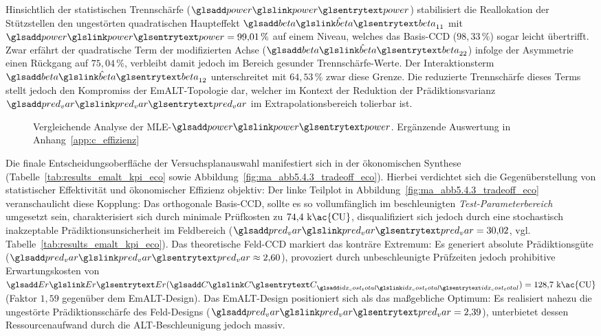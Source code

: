 Hinsichtlich der statistischen Trennschärfe ($\sym{power}$) stabilisiert die Reallokation der Stützstellen den ungestörten quadratischen Haupteffekt $\hat{\sym{beta}}_{11}$ mit $\sym{power} = 99{,}01\,\%$ auf einem Niveau, welches das Basis-\ac{CCD} ($98{,}33\,\%$) sogar leicht übertrifft.
Zwar erfährt der quadratische Term der modifizierten Achse ($\hat{\sym{beta}}_{22}$) infolge der Asymmetrie einen Rückgang auf $75{,}04\,\%$, verbleibt damit jedoch im Bereich gesunder Trennschärfe-Werte.
Der Interaktionsterm $\hat{\sym{beta}}_{12}$ unterschreitet mit $64{,}53\,\%$ zwar diese Grenze.
Die reduzierte Trennschärfe dieses Terms stellt jedoch den Kompromiss der \ac{EmALT}-Topologie dar, welcher im Kontext der Reduktion der Prädiktionsvarianz $\sym{pred_var}$ im Extrapolationsbereich tolierbar ist.
\begin{figure}[htbp]
    \centering
    \setlength{}
    \setlength\figureheight{5cm}
    
    \caption{Vergleichende Analyse der \ac{MLE}-$\sym{power}$. Ergänzende Auswertung in Anhang~\ref{app:c_effizienz}}
    \label{fig:ma_abb5.4.3_powerdev_wbl}
\end{figure}
Die finale Entscheidungsoberfläche der Versuchsplanauswahl manifestiert sich in der ökonomischen Synthese (Tabelle~\ref{tab:results_emalt_kpi_eco} sowie Abbildung~\ref{fig:ma_abb5.4.3_tradeoff_eco}).
Hierbei verdichtet sich die Gegenüberstellung von statistischer Effektivität und ökonomischer Effizienz objektiv:
Der linke Teilplot in Abbildung~\ref{fig:ma_abb5.4.3_tradeoff_eco} veranschaulicht diese Kopplung:
Das orthogonale Basis-\ac{CCD}, sollte es so vollumfänglich im beschleunigten \textit{Test-Parameterbereich} umgesetzt sein, charakterisiert sich durch minimale Prüfkosten zu $74{,}4\text{ k\ac{CU}}$, disqualifiziert sich jedoch durch eine stochastisch inakzeptable Prädiktionsunsicherheit im Feldbereich ($\sym{pred_var} = 30{,}02$, vgl. Tabelle~\ref{tab:results_emalt_kpi_eco}).
Das theoretische Feld-\ac{CCD} markiert das konträre Extremum: Es generiert absolute Prädiktionsgüte ($\sym{pred_var} \approx 2{,}60$), provoziert durch unbeschleunigte Prüfzeiten jedoch prohibitive Erwartungskosten von $\sym{Er}(\sym{C}_{\sym{idx_cost_total}}) = 128{,}7\text{ k\ac{CU}}$ (Faktor $1{,}59$ gegenüber dem \ac{EmALT}-Design).
Das \ac{EmALT}-Design positioniert sich als das maßgebliche Optimum: Es realisiert nahezu die ungestörte Prädiktionsschärfe des Feld-Designs ($\sym{pred_var} = 2{,}39$), unterbietet dessen Ressourcenaufwand durch die \ac{ALT}-Beschleunigung jedoch massiv.


